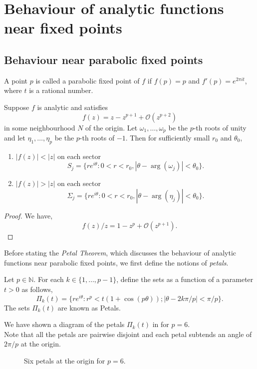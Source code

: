 \chapter{Behaviour of analytic functions near fixed points}
\section{Behaviour near parabolic fixed points}
A point \( p \) is called a parabolic fixed point of \( f \)
if \( f(p)=p \) and \( f'(p)=e^{2\pi i t} \), where \( t \)
is a rational number.

\begin{lemma}\label{lem2.1}
	Suppose \( f \) is analytic and satisfies \[
		f(z)=z-z^{p+1}+\mathcal{O}(z^{p+2})
	\] in some neighbourhood \( N \) of the origin. Let \( \omega_1,\ldots ,\omega_p \) be the \( p \)-th
	roots of unity and let \( \eta_1,\ldots ,\eta_p \) be the \( p \)-th roots of \( -1 \).
	Then for sufficiently small \( r_0 \) and \( \theta _0 \), 
	\begin{enumerate}
		\item \( |f(z)|<|z| \) on each sector \[
				S_j=\{re^{i\theta}:0<r<r_0,|\theta -\arg(\omega_j)|<\theta _0\}
		.\] 
	\item \( |f(z)|>|z| \) on each sector \[
				\Sigma_j=\{re^{i\theta}:0<r<r_0,|\theta -\arg(\eta_j)|<\theta _0\}
	.\] 
	\end{enumerate}
\end{lemma}
\begin{proof}
	We have, \[
		f(z) /z=1-z^p+\mathcal{O}(z^{p+1})
	.\] 
\end{proof}

Before stating the \emph{Petal Theorem}, which discusses the
behaviour of analytic functions near parabolic fixed points, we first define the notions
of \emph{petals}.
\begin{definition}[Petals]
	Let \( p\in \mathbb{N} \). For each \( k\in\{1,\ldots ,p-1\} \), define the sets as a function of a parameter \( t>0 \)
	as follows, \[
		\Pi_k(t)=\{re^{i\theta}:r^p<t(1+\cos (p\theta));|\theta-2k\pi /p|<\pi /p\}
	.\] 
	The sets \( \Pi_k(t) \) are known as Petals.
\end{definition}
We have shown a diagram of the petals \( \Pi_k(t) \) in  for \( p=6 \).\\
Note that all the petals are pairwise disjoint and each petal subtends an angle of \( 2\pi /p \) at the origin.

\begin{figure}[ht]
	\centering
	\caption{Six petals at the origin for $p=6$.}
	\label{petals}
\end{figure}

